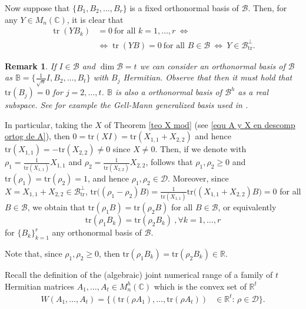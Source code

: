 \documentclass[12pt,a4paper]{article}
\def\calB{\mathcal B}
\def\calD{\mathcal D}
\def\R{\mathbb R}
\def\C{\mathbb C}
\def\tr{\text{tr}}
\newtheorem{remark}{Remark}
\numberwithin{equation}{section}
\begin{document}
Now suppose that $\{B_1, B_2, \dots, B_r\}$ is a fixed orthonormal basis of $\mathcal{B}$. Then, for any $Y \in M_n(\mathbb{C})$, it is clear that
\begin{equation*}
	\begin{split}
\operatorname{tr}(Y B_k) &= 0 \ \text{for all } k = 1, \dots, r 
\ \Leftrightarrow \\
& \Leftrightarrow\operatorname{tr}(Y B) = 0 \ \text{for all } B \in \mathcal{B} 
\ \Leftrightarrow\ 
Y \in \mathcal{B}^\perp_{\operatorname{tr}}.
	\end{split}
\end{equation*}


\begin{remark}
	If $I\in\calB$ and $\dim\calB=t$ we can consider an orthonormal basis of $\calB$ as $\mathbb{B}=\{\frac1{\sqrt{n}} I,B_2,\dots,B_t \}$ with $B_j$ Hermitian. Observe that then it must hold that $\tr(B_j)=0$ for $j=2,\dots, t$. $\mathbb{B}$ is also a orthonormal basis of $\calB^h$ as a real subspace. See for example the Gell-Mann generalized basis used in \cite[proof of Proposition 9]{BV-Moment}.
\end{remark}

In particular, taking the $X$ of Theorem \ref{teo X mod} (see \eqref{equ A y X en descomp ortog de A}), then $0=\tr(X I)=\tr(X_{1,1}+X_{2,2})$ and hence $\tr(X_{1,1})=-\tr(X_{2,2})\neq 0$ since $X\neq 0$.
Then, if we denote with $\rho_1=\frac1{\tr(X_{1,1})}X_{1,1}$ and $\rho_2=\frac1{\tr(X_{2,2})}X_{2,2}$, follows that $\rho_1,\rho_2\geq0$ and $\tr(\rho_1)=\tr(\rho_2)=1$, and hence $\rho_1,\rho_2\in\calD$. Moreover, since $X=X_{1,1}+X_{2,2}\in \calB_{\tr}^\perp$, $\tr\big((\rho_1-\rho_2)B\big)=\frac1{\tr(X_{1,1})}\tr\big((X_{1,1}+X_{2,2})B\big)=0$ for all $B\in\calB$, we obtain that $\tr(\rho_1 B)=\tr(\rho_2 B)$ for all $B\in\calB$, or equivalently
$$
\tr(\rho_1 B_k)=\tr(\rho_2 B_k) \ , \forall k=1,\dots, r 
$$
for $\{B_k\}_{k=1}^r$ any orthonormal basis of $\calB$.



Note that, since $\rho_1 , \rho_2\geq0 $, then $\tr(\rho_1 B_k)=\tr(\rho_2 B_k)\in\R$.



Recall the definition of the (algebraic) joint numerical range of a family of $t$ Hermitian matrices $A_1, \dots, A_t\in M_n^h(\C)$ which is the convex set of $\R^t$
\begin{equation} \label{def jnr}
	\begin{split}
		W(A_1, \dots, A_t) = \{  (\tr(\rho A_1),   \dots, \tr(\rho A_t))& \in \R^t:	\, \rho \in \calD \}.
	\end{split}
\end{equation}
\end{document}
